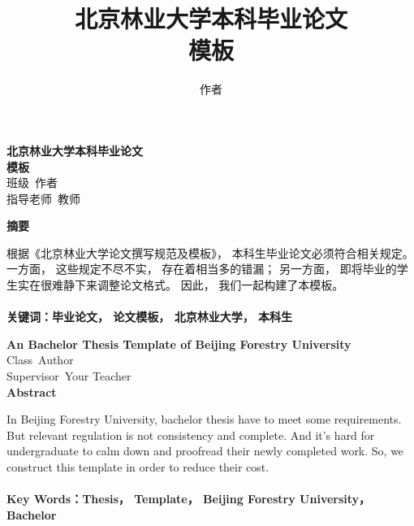 \documentclass[UTF8]{ctexart}
\title{北京林业大学本科毕业论文\\模板}
\author{作者}
\numberwithin{figure}{section}
\numberwithin{equation}{section}
\begin{document}

\begin{titlepage}
\begin{center}

\textbf{北京林业大学本科毕业论文\\模板}\\

班级\ 作者\\
指导老师\ 教师\\

\end{center}


\begin{center}
\textbf{摘要}
\end{center}

根据《北京林业大学论文撰写规范及模板》， 本科生毕业论文必须符合相关规定。 一方面， 这些规定不尽不实， 存在着相当多的错漏； 另一方面， 即将毕业的学生实在很难静下来调整论文格式。 因此， 我们一起构建了本模板。\\\\

\textbf{关键词：毕业论文， 论文模板， 北京林业大学， 本科生}
\pagebreak


\begin{center}
\textbf{An Bachelor Thesis Template of Beijing Forestry University }\\
Class\ Author\\
Supervisor\ Your Teacher\\
\textbf{Abstract}
\end{center}

In Beijing Forestry University, bachelor thesis have to meet some requirements. But relevant regulation is not consistency and complete. And it's hard for undergraduate to calm down and proofread their newly completed work. So, we construct this template in order to reduce their cost. \\\\

\textbf{Key Words：Thesis， Template， Beijing Forestry University， Bachelor}

\end{titlepage}
\end{document}
